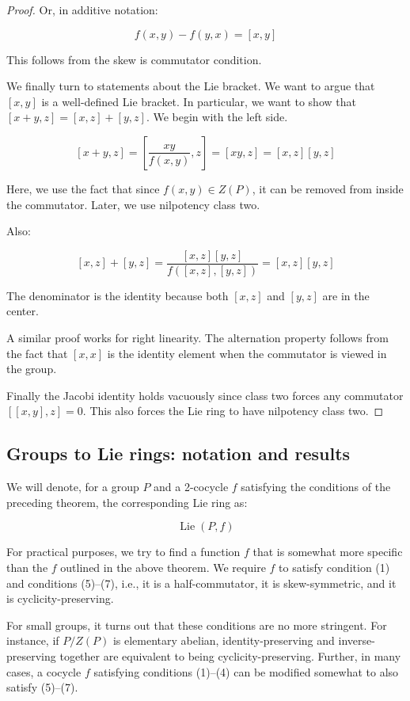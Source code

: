 \documentclass[10pt]{amsart}
\begin{document}
\begin{proof}
  Or, in additive notation:

  $$f(x,y) - f(y,x) = [x,y]$$

  This follows from the skew is commutator condition.

  We finally turn to statements about the Lie bracket. We want to
  argue that $[x,y]$ is a well-defined Lie bracket. In particular, we
  want to show that $[x + y,z] = [x,z] + [y,z]$. We begin with the left side.

  $$[x + y,z] = [\frac{xy}{f(x,y)},z] = [xy,z] = [x,z][y,z]$$

  Here, we use the fact that since $f(x,y) \in Z(P)$, it can be
  removed from inside the commutator. Later, we use nilpotency class two.

  Also:

  $$[x,z] + [y,z] = \frac{[x,z][y,z]}{f([x,z],[y,z])} = [x,z][y,z]$$

  The denominator is the identity because both $[x,z]$ and $[y,z]$ are
  in the center.

  A similar proof works for right linearity. The alternation property
  follows from the fact that $[x,x]$ is the identity element when the
  commutator is viewed in the group.

  Finally the Jacobi identity holds vacuously since class two forces
  any commutator $[[x,y],z] = 0$. This also forces the Lie ring to
  have nilpotency class two.
\end{proof}

\subsection{Groups to Lie rings: notation and results}

We will denote, for a group $P$ and a 2-cocycle $f$ satisfying the
conditions of the preceding theorem, the corresponding Lie ring as:

$$\operatorname{Lie}(P,f)$$

For practical purposes, we try to find a function $f$ that is somewhat
more specific than the $f$ outlined in the above theorem. We require
$f$ to satisfy condition (1) and conditions (5)--(7), i.e., it is a
half-commutator, it is skew-symmetric, and it is cyclicity-preserving.

For small groups, it turns out that these conditions are no more
stringent. For instance, if $P/Z(P)$ is elementary abelian,
identity-preserving and inverse-preserving together are equivalent to
being cyclicity-preserving. Further, in many cases, a cocycle $f$
satisfying conditions (1)--(4) can be modified somewhat to also
satisfy (5)--(7).
\end{document}
